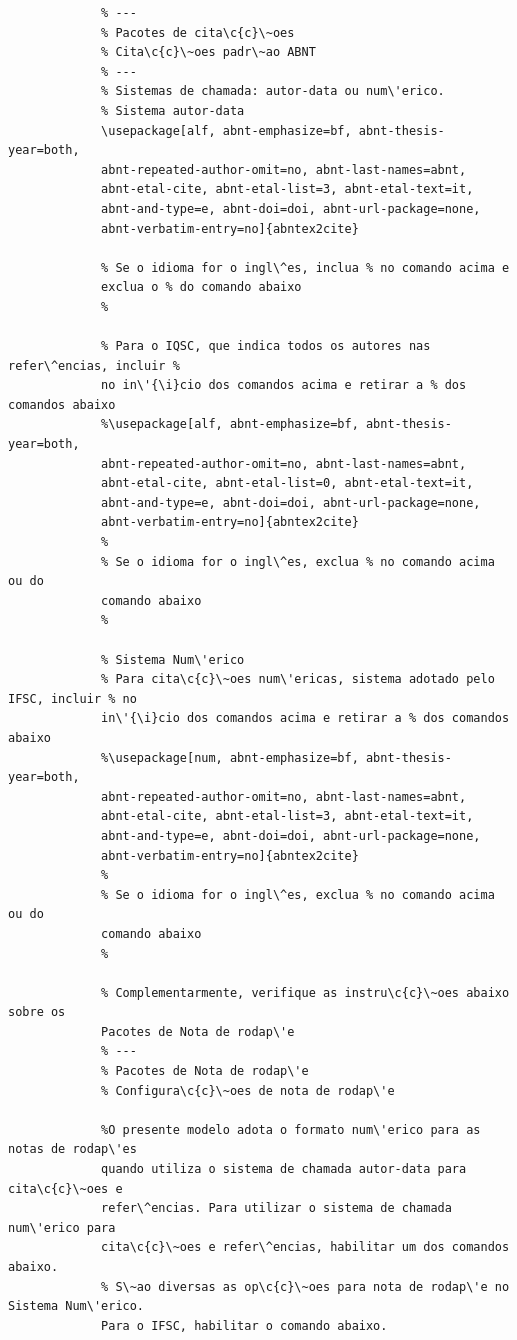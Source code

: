 			 \begin{verbatim}
			 % ---
			 % Pacotes de cita\c{c}\~oes
			 % Cita\c{c}\~oes padr\~ao ABNT
			 % ---
			 % Sistemas de chamada: autor-data ou num\'erico.
			 % Sistema autor-data
			 \usepackage[alf, abnt-emphasize=bf, abnt-thesis-year=both,
			 abnt-repeated-author-omit=no, abnt-last-names=abnt,
			 abnt-etal-cite, abnt-etal-list=3, abnt-etal-text=it,
			 abnt-and-type=e, abnt-doi=doi, abnt-url-package=none,
			 abnt-verbatim-entry=no]{abntex2cite}
			 
			 % Se o idioma for o ingl\^es, inclua % no comando acima e 
			 exclua o % do comando abaixo
			 %
			 
			 % Para o IQSC, que indica todos os autores nas refer\^encias, incluir % 
			 no in\'{\i}cio dos comandos acima e retirar a % dos comandos abaixo 
			 %\usepackage[alf, abnt-emphasize=bf, abnt-thesis-year=both,
			 abnt-repeated-author-omit=no, abnt-last-names=abnt,
			 abnt-etal-cite, abnt-etal-list=0, abnt-etal-text=it,
			 abnt-and-type=e, abnt-doi=doi, abnt-url-package=none,
			 abnt-verbatim-entry=no]{abntex2cite} 
			 %
			 % Se o idioma for o ingl\^es, exclua % no comando acima ou do
			 comando abaixo
			 %
			 
			 % Sistema Num\'erico
			 % Para cita\c{c}\~oes num\'ericas, sistema adotado pelo IFSC, incluir % no 
			 in\'{\i}cio dos comandos acima e retirar a % dos comandos abaixo
			 %\usepackage[num, abnt-emphasize=bf, abnt-thesis-year=both,
			 abnt-repeated-author-omit=no, abnt-last-names=abnt,
			 abnt-etal-cite, abnt-etal-list=3, abnt-etal-text=it,
			 abnt-and-type=e, abnt-doi=doi, abnt-url-package=none,
			 abnt-verbatim-entry=no]{abntex2cite} 
			 %
			 % Se o idioma for o ingl\^es, exclua % no comando acima ou do
			 comando abaixo
			 %
			 
			 % Complementarmente, verifique as instru\c{c}\~oes abaixo sobre os
			 Pacotes de Nota de rodap\'e
			 % ---
			 % Pacotes de Nota de rodap\'e
			 % Configura\c{c}\~oes de nota de rodap\'e
			  
			 %O presente modelo adota o formato num\'erico para as notas de rodap\'es 
			 quando utiliza o sistema de chamada autor-data para cita\c{c}\~oes e 
			 refer\^encias. Para utilizar o sistema de chamada num\'erico para 
			 cita\c{c}\~oes e refer\^encias, habilitar um dos comandos abaixo.
			 % S\~ao diversas as op\c{c}\~oes para nota de rodap\'e no Sistema Num\'erico.  
			 Para o IFSC, habilitar o comando abaixo.
			  

\end{verbatim}
